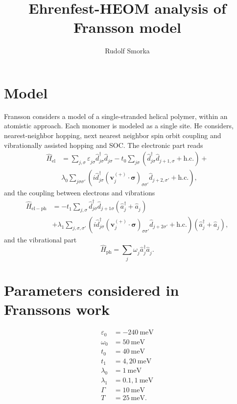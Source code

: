 \documentclass{article}
\renewcommand{\vec}[1]{\mathbf{#1}}
\newcommand{\pdagger}{{\phantom{\dagger}}}
\begin{document}
\title{Ehrenfest-HEOM analysis of Fransson model}
\author{Rudolf Smorka}
\maketitle
\section{Model}
Fransson considers a model of a single-stranded helical polymer, within an atomistic approach. Each monomer is modeled as a single site. He considers, nearest-neighbor hopping, next nearest neighbor spin orbit coupling and vibrationally assisted hopping and SOC. The electronic part reads
\begin{equation}
	\begin{split}
		\hat{H}_\mathrm{el} &= \sum_{j,\sigma} \varepsilon_{j\sigma}^\pdagger \hat{d}_{j\sigma}^\dagger \hat{d}_{j\sigma}^\pdagger - t_0 \sum_{j\sigma} (\hat{d}_{j\sigma}^\dagger \hat{d}_{j+1,\sigma}^\pdagger + \mathrm{h.c.}) +\\& \lambda_0^\pdagger\sum_{j\sigma\sigma'} (i\hat{d}_{j\sigma}^\dagger (\vec{v}_j^{(+)}\cdot \bm{\sigma})_{\sigma\sigma'}^\pdagger \hat{d}_{j+2,\sigma'}^\pdagger + \mathrm{h.c.}),
	\end{split}
\end{equation}
and the coupling between electrons and vibrations
\begin{align}
	\hat{H}_\mathrm{el-ph} &= - t_1^\pdagger \sum_{j,\sigma}  \hat{d}_{j\sigma}^\dagger \hat{d}_{j+1\sigma}^\pdagger (\hat{a}_{j}^\dagger + \hat{a}_{j}^\pdagger) \\ & + \lambda_1^\pdagger\sum_{j,\sigma,\sigma'} (i \hat{d}_{j\sigma}^\dagger (\vec{v}_j^{(+)} \cdot \bm{\sigma})_{\sigma\sigma'}^\pdagger \hat{d}_{j+2\sigma'}^\pdagger +\mathrm{h.c.})(\hat{a}_{j}^\dagger + \hat{a}_{j}^\pdagger),\label{eq:HelPh}
\end{align}
and the vibrational part
\begin{equation}
	\hat{H}_\mathrm{ph} = \sum_{j} \omega_{j}^\pdagger \hat{a}_{j}^\dagger \hat{a}_{j}^\pdagger.
	\label{eq:HPh} 
\end{equation}

\section{Parameters considered in Franssons work}
\begin{align*}
	\varepsilon_0 &= -\SI{240}{\milli\electronvolt}\\
	\omega_0 &= \SI{50}{\milli\electronvolt}\\
	t_0 &= \SI{40}{\milli\electronvolt}\\
	t_1 &= 4,\SI{20}{\milli\electronvolt}\\
	\lambda_0 &= \SI{1}{\milli\electronvolt}\\
	\lambda_1 &= 0.1,\SI{1}{\milli\electronvolt}\\
	\Gamma &= \SI{10}{\milli\electronvolt}\\
	T &= \SI{25}{\milli\electronvolt}.
\end{align*}
\end{document}
